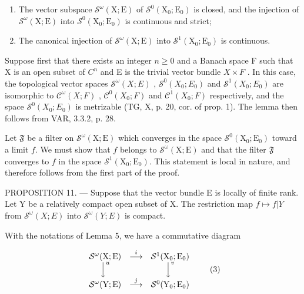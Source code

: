 \begin{enumerate}
\def\labelenumi{\alph{enumi})}
\item
  The vector subspace \(\mathcal{S}^{\omega}(\mathrm{X};\mathrm{E})\) of \(\mathcal{S}^{0}(\mathrm{X}_{0};\mathrm{E}_{0})\) is closed, and the injection of \(\mathcal{S}^{\omega}(\mathrm{X};\mathrm{E})\) into \(\mathcal{S}^{0}(\mathrm{X}_{0};\mathrm{E}_{0})\) is continuous and strict;
\item
  The canonical injection of \(\mathcal{S}^{\omega}(\mathrm{X};\mathrm{E})\) into \(\mathcal{S}^{1}(\mathrm{X}_{0};\mathrm{E}_{0})\) is continuous.
\end{enumerate}

Suppose first that there exists an integer \(n \geqslant 0\) and a Banach space F such that X is an open subset of \(C^{n}\) and E is the trivial vector bundle \(X \times F\) . In this case, the topological vector spaces \(\mathcal{S}^{\omega}(X;E)\) , \(\mathcal{S}^{0}(X_{0};E_{0})\) and \(\mathcal{S}^{1}(X_{0};E_{0})\) are isomorphic to \(\mathcal{C}^{\omega}(X;F)\) , \(\mathcal{C}^{0}(X_{0};F)\) and \(\mathcal{C}^{1}(X_{0};F)\) respectively, and the space \(\mathcal{S}^{0}(X_{0};E_{0})\) is metrizable (TG, X, p. 20, cor. of prop. 1). The lemma then follows from VAR, 3.3.2, p. 28.

Let \(\mathfrak{F}\) be a filter on \(\mathcal{S}^{\omega}(\mathrm{X};\mathrm{E})\) which converges in the space \(\mathcal{S}^{0}(\mathrm{X}_{0};\mathrm{E}_{0})\) toward a limit \(f\). We must show that \(f\) belongs to \(\mathcal{S}^{\omega}(\mathrm{X};\mathrm{E})\) and that the filter \(\mathfrak{F}\) converges to \(f\) in the space \(\mathcal{S}^{1}(\mathrm{X}_{0};\mathrm{E}_{0})\). This statement is local in nature, and therefore follows from the first part of the proof.

PROPOSITION 11. --- Suppose that the vector bundle E is locally of finite rank. Let Y be a relatively compact open subset of X. The restriction map \(f \mapsto f|Y\) from \(\mathcal{S}^{\omega}(X;E)\) into \(\mathcal{S}^{\omega}(Y;E)\) is compact.

With the notations of Lemma 5, we have a commutative diagram

\[
\begin{array}{c c c} \mathcal {S} ^ {\omega} (\mathrm{X}; \mathrm{E}) & \stackrel {{i}} {{\longrightarrow}} & \mathcal {S} ^ {1} (\mathrm{X} _ {0}; \mathrm{E} _ {0}) \\ \Big \downarrow^ {u} & & \Big \downarrow^ {v} \\ \mathcal {S} ^ {\omega} (\mathrm{Y}; \mathrm{E}) & \stackrel {{j}} {{\longrightarrow}} & \mathcal {S} ^ {0} (\mathrm{Y} _ {0}; \mathrm{E} _ {0}) \end{array}\tag{3}
\]

